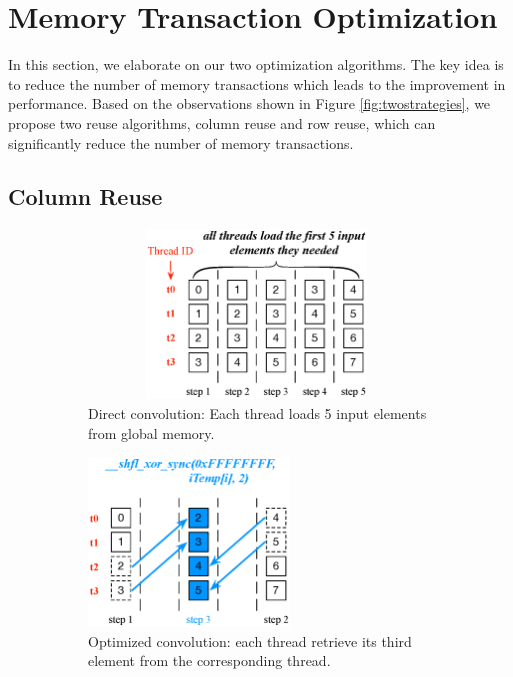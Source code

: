 \section{Memory Transaction Optimization}
\label{sec:strategies} In this section, we elaborate on our two optimization algorithms. The key idea is to reduce the  number of memory
transactions which leads to the improvement in performance. Based on the observations shown in Figure \ref{fig:twostrategies}, we propose
two reuse algorithms, column reuse and row reuse, which can significantly reduce the number of memory transactions.


\subsection{Column Reuse\label{sec:creuse}}
\begin{figure}
	\begin{subfigure}{0.33\textwidth}
		\centering
		\captionsetup{width=0.9\textwidth}
		 \includegraphics[width=0.98\textwidth,height=4.5cm]{./figure/directconv.eps}
		 \caption{Direct convolution: Each thread loads 5 input elements from global memory.}
		 \label{fig:directalgo}
	\end{subfigure}
	\begin{subfigure}{0.3\textwidth}
		\centering
		\captionsetup{width=0.9\textwidth}
		 \includegraphics[width=\textwidth,height=4.5cm]{./figure/optalgo1.eps}
		 \caption{Optimized convolution: each thread retrieve its third element from the corresponding thread.}
		 \label{fig:optalgo1}
	\end{subfigure}
	\begin{subfigure}{0.3\textwidth}
		\centering
		\captionsetup{width=0.9\textwidth}


\end{subfigure}
\end{figure}
